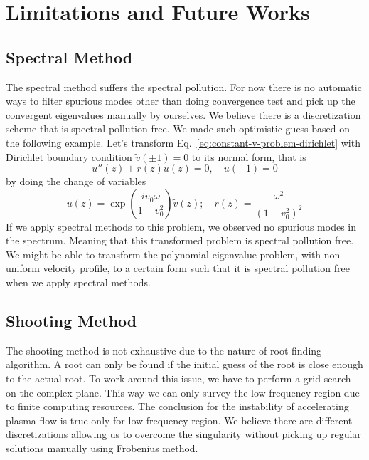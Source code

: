 \section{Limitations and Future Works}
\subsection{Spectral Method}
The spectral method suffers the spectral pollution. For now there is no automatic ways to filter spurious modes other than doing convergence test and pick up the convergent eigenvalues manually by ourselves. We believe there is a discretization scheme that is spectral pollution free. We made such optimistic guess based on the following example. Let's transform Eq.~\ref{eq:constant-v-problem-dirichlet} with Dirichlet boundary condition $\tilde{v}(\pm 1) = 0$ to its normal form, that is
\begin{equation}
	u''(z) + r(z)u(z) = 0, \quad u(\pm 1) = 0
\end{equation}
by doing the change of variables
\begin{equation}
	u(z) = \exp\left(\frac{iv_0\omega}{1-v_0^2}\right)\tilde{v}(z); \quad
	r(z) = \frac{\omega^2}{(1-v_0^2)^2}
\end{equation}
If we apply spectral methods to this problem, we observed no spurious modes in the spectrum. Meaning that this transformed problem is spectral pollution free. We might be able to transform the polynomial eigenvalue problem, with non-uniform velocity profile, to a certain form such that it is spectral pollution free when we apply spectral methods.

\subsection{Shooting Method}
The shooting method is not exhaustive due to the nature of root finding algorithm. A root can only be found if the initial guess of the root is close enough to the actual root. To work around this issue, we have to perform a grid search on the complex plane. This way we can only survey the low frequency region due to finite computing resources. The conclusion for the instability of accelerating plasma flow is true only for low frequency region. We believe there are different discretizations allowing us to overcome the singularity without picking up regular solutions manually using Frobenius method.


